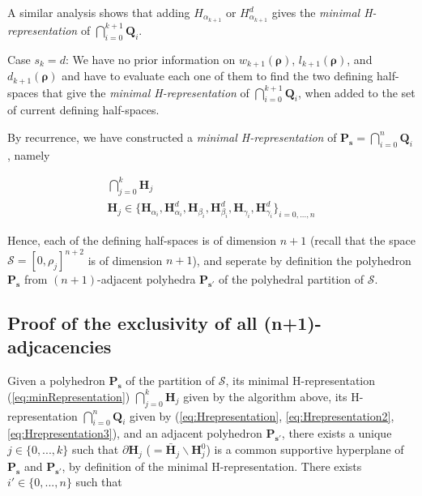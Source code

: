 \documentclass[11pt]{article}
\numberwithin{equation}{section}
\numberwithin{figure}{section}
\numberwithin{table}{section}
\begin{document}
\noindent A similar analysis shows that adding $H_{\alpha_{k+1}}$ or $H^{d}_{\alpha_{k+1}}$ gives the \textit{minimal H-representation} of $\bigcap_{i=0}^{k+1} \textbf{Q}_{i}$.

Case $s_{k}=d$: We have no prior information on $w_{k+1}(\boldsymbol\rho)$, $l_{k+1}(\boldsymbol\rho)$, and $d_{k+1}(\boldsymbol\rho)$ and have to evaluate each one of them to find the two defining half-spaces that give the \textit{minimal H-representation} of $\bigcap_{i=0}^{k+1} \textbf{Q}_{i}$, when added to the set of current defining half-spaces.

By recurrence, we have constructed a \textit{minimal H-representation} of $\textbf{P}_{\boldsymbol s}=\bigcap_{i=0}^{n} \textbf{Q}_{i}$, namely

\begin{equation}
\begin{array}{l}
\bigcap_{j=0}^{k} \textbf{H}_{j}\\
\textbf{H}_{j}\in \{\textbf{H}_{\alpha_{i}}, \textbf{H}^{d}_{\alpha_{i}}, \textbf{H}_{\beta_{i}}, \textbf{H}^{d}_{\beta_{i}}, \textbf{H}_{\gamma_{i}}, \textbf{H}^{d}_{\gamma_{i}}\}_{i=0,...,n}
\end{array}
\label{eq:minRepresentation}
\end{equation}

\noindent Hence, each of the defining half-spaces is of dimension $n+1$ \cite{Gruenbaum2003} (recall that the space $\mathcal{S} = [0,\rho_{j}]^{n+2}$ is of dimension $n+1$), and seperate by definition the polyhedron $\textbf{P}_{\boldsymbol s}$ from $(n+1)$-adjacent polyhedra $\textbf{P}_{\boldsymbol s'}$ of the polyhedral partition of $\mathcal{S}$.


\subsection{Proof of the exclusivity of all (n+1)-adjcacencies}\label{sec:adjacency}

Given a polyhedron $\textbf{P}_{\boldsymbol s}$ of the partition of $\mathcal{S}$, its minimal H-representation (\ref{eq:minRepresentation}) $\bigcap_{j=0}^{k} \textbf{H}_{j}$ given by the algorithm above, its H-representation $\bigcap_{i=0}^{n} \textbf{Q}_{i}$ given by (\ref{eq:Hrepresentation}, \ref{eq:Hrepresentation2}, \ref{eq:Hrepresentation3}), and an adjacent polyhedron $\textbf{P}_{\boldsymbol s'}$, there exists a unique $j\in\{0,...,k\}$ such that $\partial \textbf{H}_{j}$ ($=\bar{\textbf{H}}_{j} \backslash \textbf{H}^{0}_{j}$) is a common supportive hyperplane of $\textbf{P}_{\boldsymbol s}$ and $\textbf{P}_{\boldsymbol s'}$, by definition of the minimal H-representation. There exists $i'\in\{0,...,n\}$ such that
\end{document}
